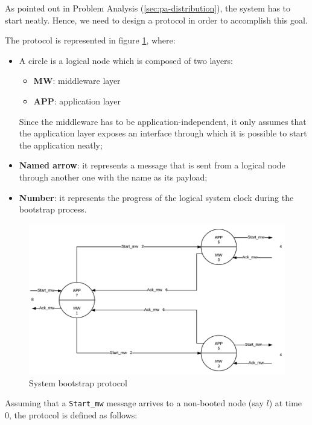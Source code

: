 As pointed out in Problem Analysis (\ref{sec:pa-distribution}), the system has
to start neatly. Hence, we need to design a protocol in order to accomplish 
this goal.

The protocol is represented in figure \ref{fig:sys-bootstrap-protocol}, where:

\begin{itemize}
  \item A circle is a logical node which is composed of two layers:
    \begin{itemize}
      \item \textbf{MW}:  middleware layer
      \item \textbf{APP}: application layer
  \end{itemize}
    Since the middleware has to be application-independent, it only assumes 
    that the application layer exposes an interface through which it is 
    possible to start the application neatly;
  \item \textbf{Named arrow}: it represents a message that is sent from a 
logical node through another one with the name as its payload;
  \item \textbf{Number}: it represents the progress of the logical system clock 
during the bootstrap process.
\end{itemize}

\begin{figure}[H]
  \centering
  \includegraphics[width=\columnwidth]{sections/images/solution/bootstrap.pdf}
  \caption{System bootstrap protocol}
  \label{fig:sys-bootstrap-protocol}
\end{figure}

Assuming that a \texttt{Start\_mw} message arrives to a non-booted node (say
$l$) at time 0, the protocol is defined as follows:

